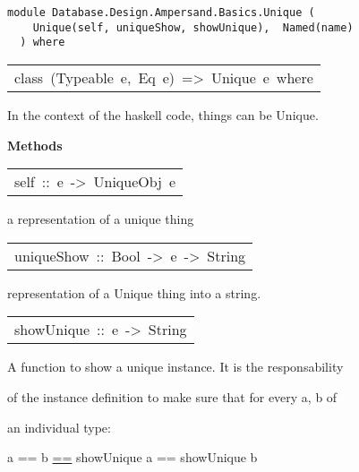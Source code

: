 \label{module:Database.Design.Ampersand.Basics.Unique}
\haddockbeginheader
{\haddockverb\begin{verbatim}
module Database.Design.Ampersand.Basics.Unique (
    Unique(self, uniqueShow, showUnique),  Named(name)
  ) where\end{verbatim}}
\haddockendheader

\begin{haddockdesc}
\item[\begin{tabular}{@{}l}
class\ (Typeable\ e,\ Eq\ e)\ =>\ Unique\ e\ where
\end{tabular}]\haddockbegindoc
In the context of the haskell code, things can be Unique. 
\par

\haddockpremethods{}\textbf{Methods}
\begin{haddockdesc}
\item[\begin{tabular}{@{}l}
self\ ::\ e\ ->\ UniqueObj\ e
\end{tabular}]\haddockbegindoc
a representation of a unique thing
\par

\end{haddockdesc}
\begin{haddockdesc}
\item[\begin{tabular}{@{}l}
uniqueShow\ ::\ Bool\ ->\ e\ ->\ String
\end{tabular}]\haddockbegindoc
representation of a Unique thing into a string.  
\par

\end{haddockdesc}
\begin{haddockdesc}
\item[\begin{tabular}{@{}l}
showUnique\ ::\ e\ ->\ String
\end{tabular}]\haddockbegindoc
A function to show a unique instance. It is the responsability

   of the instance definition to make sure that for every a, b of 

   an individual type:

        a == b  \url{==} showUnique a == showUnique b
\par

\end{haddockdesc}
\end{haddockdesc}
